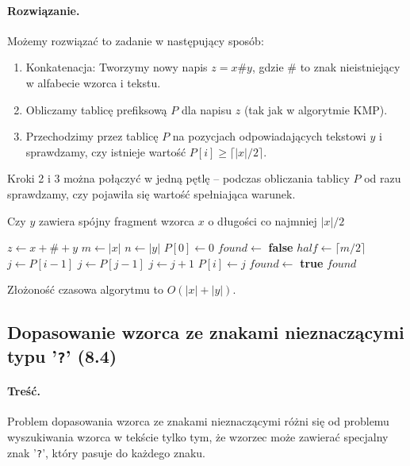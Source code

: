 \paragraph{Rozwiązanie.}
Możemy rozwiązać to zadanie w następujący sposób:

\begin{enumerate}
	\item Konkatenacja: Tworzymy nowy napis $z = x \# y$, gdzie $\#$ to znak nieistniejący w alfabecie wzorca i tekstu.
	\item Obliczamy tablicę prefiksową $P$ dla napisu $z$ (tak jak w algorytmie KMP).
	\item Przechodzimy przez tablicę $P$ na pozycjach odpowiadających tekstowi $y$ i sprawdzamy, czy istnieje wartość $P[i] \geq \lceil |x|/2 \rceil$.
\end{enumerate}

Kroki 2 i 3 można połączyć w jedną pętlę -- podczas obliczania tablicy $P$ od razu sprawdzamy, czy pojawiła się wartość spełniająca warunek.

\begin{algorithm}[H]
	\caption{Czy $y$ zawiera spójny fragment wzorca $x$ o długości co najmniej $|x|/2$}
	\begin{algorithmic}[1]
			\State $z \gets x + \# + y$ 
			\State $m \gets |x|$
			\State $n \gets |y|$
			\State $P[0] \gets 0$
			\State $found \gets$ \textbf{false}
			\State $half \gets \lceil m/2 \rceil$
				\State $j \gets P[i-1]$
					\State $j \gets P[j-1]$
				\EndWhile
					\State $j \gets j + 1$
				\EndIf
				\State $P[i] \gets j$
					\State $found \gets$ \textbf{true}
				\EndIf
			\EndFor
			\State \Return $found$
		\EndProcedure
	\end{algorithmic}
\end{algorithm}

Złożoność czasowa algorytmu to $O(|x| + |y|)$.

\subsection{Dopasowanie wzorca ze znakami nieznaczącymi typu '\texttt{?}' (8.4)}
\label{zadanie8.4}
\paragraph{Treść.}
Problem dopasowania wzorca ze znakami nieznaczącymi różni się od problemu wyszukiwania wzorca w tekście tylko tym, że wzorzec może zawierać specjalny znak '\texttt{?}', który pasuje do każdego znaku.

